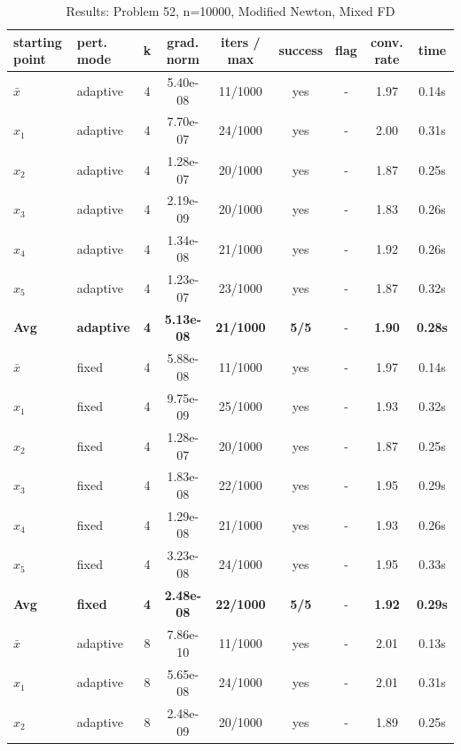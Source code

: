 \begin{longtable}{|l|l|c|c|c|c|c|c|c|}
\caption{Results: Problem 52, n=10000, Modified Newton, Mixed FD} \\
\hline
\textbf{starting point} & \textbf{pert. mode} & \textbf{k} & \textbf{grad. norm} & \textbf{iters / max} & \textbf{success} & \textbf{flag} & \textbf{conv. rate} & \textbf{time} \\
\hline
\endfirsthead
\endhead
\endfoot
\hline
\endlastfoot
$\bar{x}$ & adaptive & 4 & 5.40e-08 & 11/1000 & yes & - & 1.97 & 0.14s \\
\hline
$x_1$ & adaptive & 4 & 7.70e-07 & 24/1000 & yes & - & 2.00 & 0.31s \\
\hline
$x_2$ & adaptive & 4 & 1.28e-07 & 20/1000 & yes & - & 1.87 & 0.25s \\
\hline
$x_3$ & adaptive & 4 & 2.19e-09 & 20/1000 & yes & - & 1.83 & 0.26s \\
\hline
$x_4$ & adaptive & 4 & 1.34e-08 & 21/1000 & yes & - & 1.92 & 0.26s \\
\hline
$x_5$ & adaptive & 4 & 1.23e-07 & 23/1000 & yes & - & 1.87 & 0.32s \\
\hline
\hline\hline
\textbf{Avg} & \textbf{adaptive} & \textbf{4} & \textbf{5.13e-08} & \textbf{21/1000} & \textbf{5/5} & - & \textbf{1.90} & \textbf{0.28s} \\
\hline\hline
\hline
$\bar{x}$ & fixed & 4 & 5.88e-08 & 11/1000 & yes & - & 1.97 & 0.14s \\
\hline
$x_1$ & fixed & 4 & 9.75e-09 & 25/1000 & yes & - & 1.93 & 0.32s \\
\hline
$x_2$ & fixed & 4 & 1.28e-07 & 20/1000 & yes & - & 1.87 & 0.25s \\
\hline
$x_3$ & fixed & 4 & 1.83e-08 & 22/1000 & yes & - & 1.95 & 0.29s \\
\hline
$x_4$ & fixed & 4 & 1.29e-08 & 21/1000 & yes & - & 1.93 & 0.26s \\
\hline
$x_5$ & fixed & 4 & 3.23e-08 & 24/1000 & yes & - & 1.95 & 0.33s \\
\hline
\hline\hline
\textbf{Avg} & \textbf{fixed} & \textbf{4} & \textbf{2.48e-08} & \textbf{22/1000} & \textbf{5/5} & - & \textbf{1.92} & \textbf{0.29s} \\
\hline\hline
$\bar{x}$ & adaptive & 8 & 7.86e-10 & 11/1000 & yes & - & 2.01 & 0.13s \\
\hline
$x_1$ & adaptive & 8 & 5.65e-08 & 24/1000 & yes & - & 2.01 & 0.31s \\
\hline
$x_2$ & adaptive & 8 & 2.48e-09 & 20/1000 & yes & - & 1.89 & 0.25s \\

\end{longtable}
